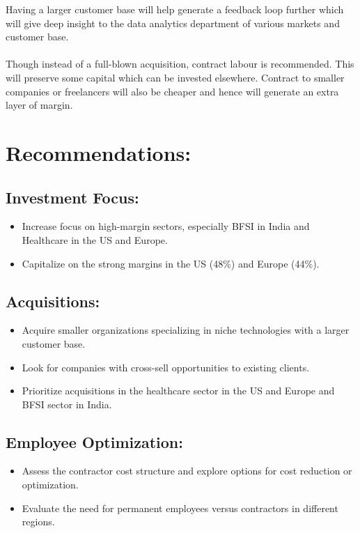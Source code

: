 \documentclass{report}
\begin{document}
Having a larger customer base will help generate a feedback loop further which will give deep insight to the data analytics department of various markets and customer base.
\\\\
Though instead of a full-blown acquisition, contract labour is recommended. This will preserve some capital which can be invested elsewhere. Contract to smaller companies or freelancers will also be cheaper and hence will generate an extra layer of margin.

\section{Recommendations:}
\subsection{Investment Focus:}
\begin{itemize}
   \item Increase focus on high-margin sectors, especially BFSI in India and Healthcare in the US and Europe.
   \item Capitalize on the strong margins in the US (48\%) and Europe (44\%).
\end{itemize}

\subsection{Acquisitions:}
\begin{itemize}
   \item Acquire smaller organizations specializing in niche technologies with a larger customer base.
   \item Look for companies with cross-sell opportunities to existing clients.
   \item Prioritize acquisitions in the healthcare sector in the US and Europe and BFSI sector in India.
\end{itemize}

\subsection{Employee Optimization:}
\begin{itemize}
   \item Assess the contractor cost structure and explore options for cost reduction or optimization.
   \item Evaluate the need for permanent employees versus contractors in different regions.
\end{itemize}
\end{document}
